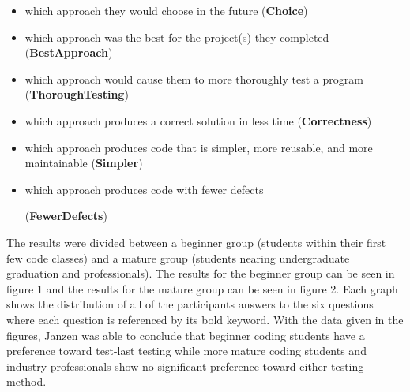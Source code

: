 \documentclass{sig-alternate}
\begin{document}
\begin{itemize}
\item which approach they would choose in the future (\textbf{Choice})
\item which approach was the best for the project(s) they
completed (\textbf{BestApproach})
\item which approach would cause them to more thoroughly
test a program (\textbf{ThoroughTesting})
\item which approach produces a correct solution in less
time (\textbf{Correctness})
\item which approach produces code that is simpler, more
reusable, and more maintainable (\textbf{Simpler})
\item which approach produces code with fewer defects

(\textbf{FewerDefects})
\end{itemize}

The results were divided between a beginner group (students within their first few code classes) and a mature group (students nearing undergraduate graduation and professionals).  The results for the beginner group can be seen in figure 1 and the results for the mature group can be seen in figure 2.  Each graph shows the distribution of all of the participants answers to the six questions where each question is referenced by its bold keyword.  With the data given in the figures, Janzen was able to conclude that beginner coding students have a preference toward test-last testing while more mature coding students and industry professionals show no significant preference toward either testing method.  


\end{document}

